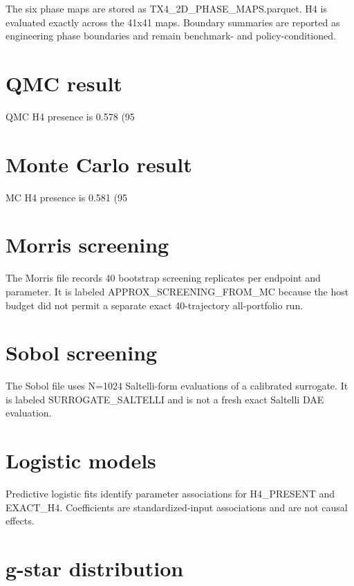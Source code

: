 \documentclass[11pt]{article}
\begin{document}
The six phase maps are stored as TX4_2D_PHASE_MAPS.parquet. H4 is evaluated exactly across the 41x41 maps. Boundary summaries are reported as engineering phase boundaries and remain benchmark- and policy-conditioned.

\section{QMC result}

QMC H4 presence is 0.578 (95%

\section{Monte Carlo result}

MC H4 presence is 0.581 (95%

\section{Morris screening}

The Morris file records 40 bootstrap screening replicates per endpoint and parameter. It is labeled APPROX_SCREENING_FROM_MC because the host budget did not permit a separate exact 40-trajectory all-portfolio run.

\section{Sobol screening}

The Sobol file uses N=1024 Saltelli-form evaluations of a calibrated surrogate. It is labeled SURROGATE_SALTELLI and is not a fresh exact Saltelli DAE evaluation.

\section{Logistic models}

Predictive logistic fits identify parameter associations for H4_PRESENT and EXACT_H4. Coefficients are standardized-input associations and are not causal effects.

\section{g-star distribution}
\end{document}
